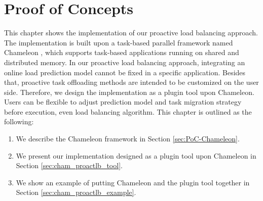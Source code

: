 \chapter{Proof of Concepts}
\label{ch:PoC}
\chaptertoc
{}

\noindent

This chapter shows the implementation of our proactive load balancing approach. The implementation is built upon a task-based parallel framework named Chameleon \cite{Klinkenberg2020ChameleonReactLB}, which supports task-based applications running on shared and distributed memory. In our proactive load balancing approach, integrating an online load prediction model cannot be fixed in a specific application. Besides that, proactive task offloading methods are intended to be customized on the user side. Therefore, we design the implementation as a plugin tool upon Chameleon. Users can be flexible to adjust prediction model and task migration strategy before execution, even load balancing algorithm. This chapter is outlined as the following:
\begin{enumerate}
	\item We describe the Chameleon framework in Section \ref{sec:PoC-Chameleon}.
	\item We present our implementation designed as a plugin tool upon Chameleon in Section \ref{sec:cham_proactlb_tool}.
	\item We show an example of putting Chameleon and the plugin tool together in Section \ref{sec:cham_proactlb_example}.
\end{enumerate}


%



%
